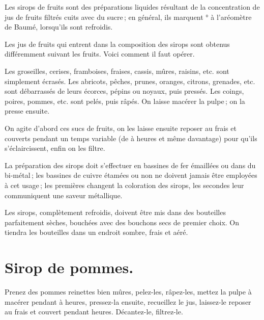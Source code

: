 \bigskip


Les sirops de fruits sont des préparations liquides résultant de la
concentration de jus de fruits filtrés cuits avec du sucre ; en général, ils
marquent {\mmm}° à l'aréomètre de Baumé, lorsqu'ils sont refroidis.

\sk

Les jus de fruits qui entrent dans la composition des sirops sont obtenus
différemment suivant les fruits. Voici comment il faut opérer.

Les groseilles, cerises, framboises, fraises, cassis, mûres, raisins, etc. sont
simplement écrasés. Les abricots, pêches, prunes, oranges, citrons, grenades,
etc. sont débarrassés de leurs écorces, pépins ou noyaux, puis pressés. Les
coings, poires, pommes, etc. sont pelés, puis râpés. On laisse macérer la
pulpe ; on la presse ensuite.

On agite d'abord ces sucs de fruits, on les laisse ensuite reposer au frais et
couverts pendant un temps variable (de {\mmm} à {\mmm} heures et
même davantage) pour qu'ils s'éclaircissent, enfin on les filtre.

\medskip

La préparation des sirops doit s'effectuer en bassines de fer émaillées ou dans
du bi-métal ; les bassines de cuivre étamées ou non ne doivent jamais être
employées à cet usage ; les premières changent la coloration des sirops, les
secondes leur communiquent une saveur métallique.

\medskip

Les sirops, complètement refroidis, doivent être mis dans des bouteilles
parfaitement sèches, bouchées avec des bouchons secs de premier choix. On
tiendra les bouteilles dans un endroit sombre, frais et aéré.

\section*{\centering Sirop de pommes.}
{}

Prenez des pommes reinettes bien mûres, pelez-les, râpez-les, mettez la pulpe
à macérer pendant {\mmm} à {\mmm} heures, pressez-la ensuite,
recueillez le jus, laissez-le reposer au frais et couvert pendant {\mmm}
heures. Décantez-le, filtrez-le.

